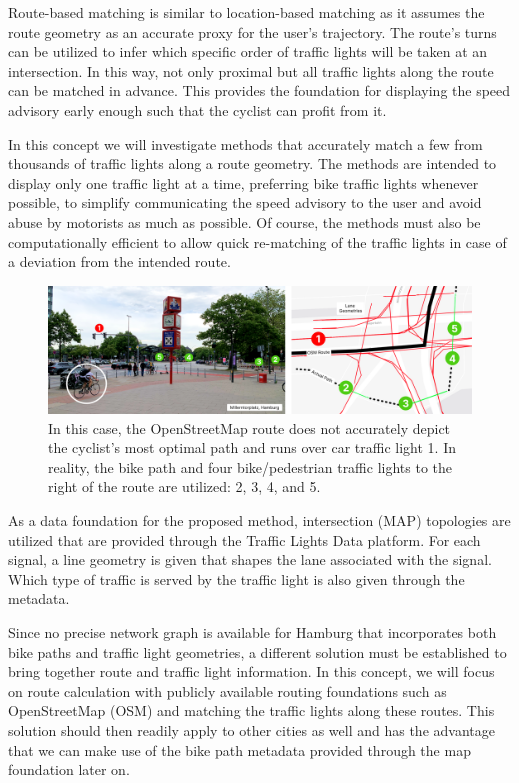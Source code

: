 Route-based matching is similar to location-based matching as it assumes the route geometry as an accurate proxy for the user's trajectory. The route's turns can be utilized to infer which specific order of traffic lights will be taken at an intersection. In this way, not only proximal but all traffic lights along the route can be matched in advance. This provides the foundation for displaying the speed advisory early enough such that the cyclist can profit from it. 

In this concept we will investigate methods that accurately match a few from thousands of traffic lights along a route geometry. The methods are intended to display only one traffic light at a time, preferring bike traffic lights whenever possible, to simplify communicating the speed advisory to the user and avoid abuse by motorists as much as possible. Of course, the methods must also be computationally efficient to allow quick re-matching of the traffic lights in case of a deviation from the intended route.

\begin{figure}[htbp]
\centering
\includegraphics[width=\linewidth]{images/sg-selection-example.png}
\caption{In this case, the OpenStreetMap route does not accurately depict the cyclist's most optimal path and runs over car traffic light 1. In reality, the bike path and four bike/pedestrian traffic lights to the right of the route are utilized: 2, 3, 4, and 5.}
\label{fig:sg-selection-example}
\end{figure}

As a data foundation for the proposed method, intersection (MAP) topologies are utilized that are provided through the Traffic Lights Data platform. For each signal, a line geometry is given that shapes the lane associated with the signal. Which type of traffic is served by the traffic light is also given through the metadata.

Since no precise network graph is available for Hamburg that incorporates both bike paths and traffic light geometries, a different solution must be established to bring together route and traffic light information. In this concept, we will focus on route calculation with publicly available routing foundations such as OpenStreetMap (OSM) and matching the traffic lights along these routes. This solution should then readily apply to other cities as well and has the advantage that we can make use of the bike path metadata provided through the map foundation later on.

